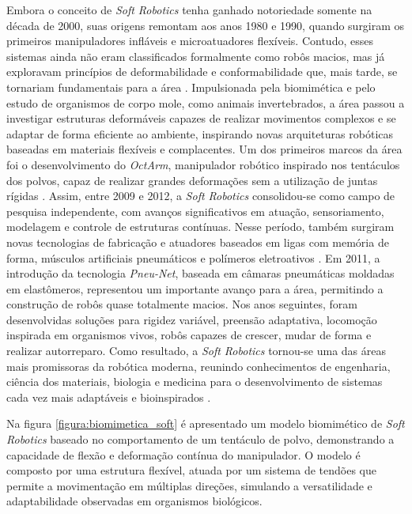 Embora o conceito de \textit{Soft Robotics} tenha ganhado notoriedade somente na década de 2000, suas origens remontam aos anos 1980 e 1990, 
quando surgiram os primeiros manipuladores infláveis e microatuadores flexíveis. Contudo, esses sistemas ainda não eram classificados formalmente 
como robôs macios, mas já exploravam princípios de deformabilidade e conformabilidade que, mais tarde, se tornariam fundamentais para a área \cite{Laschi2016SoftRobotics}. 
Impulsionada pela biomimética e pelo estudo de organismos de corpo mole, como animais invertebrados, a área passou a investigar estruturas deformáveis 
capazes de realizar movimentos complexos e se adaptar de forma eficiente ao ambiente, inspirando novas arquiteturas robóticas baseadas em materiais 
flexíveis e complacentes.
Um dos primeiros marcos da área foi o desenvolvimento do \textit{OctArm}, manipulador robótico inspirado nos tentáculos dos polvos, capaz de realizar 
grandes deformações sem a utilização de juntas rígidas \cite{Grissom2006OctArm}. Assim, entre 2009 e 2012, a \textit{Soft Robotics} consolidou-se como 
campo de pesquisa independente, com avanços significativos em atuação, sensoriamento, modelagem e controle de estruturas contínuas. Nesse período, 
também surgiram novas tecnologias de fabricação e atuadores baseados em ligas com memória de forma, músculos artificiais pneumáticos e polímeros 
eletroativos \cite{Laschi2016SoftRobotics}. Em 2011, a introdução da tecnologia \textit{Pneu-Net}, baseada em câmaras pneumáticas moldadas em elastômeros, 
representou um importante avanço para a área, permitindo a construção de robôs quase totalmente macios. Nos anos seguintes, foram desenvolvidas soluções 
para rigidez variável, preensão adaptativa, locomoção inspirada em organismos vivos, robôs capazes de crescer, mudar de forma e realizar autorreparo.
Como resultado, a \textit{Soft Robotics} tornou-se uma das áreas mais promissoras da robótica moderna, reunindo conhecimentos de engenharia, ciência dos 
materiais, biologia e medicina para o desenvolvimento de sistemas cada vez mais adaptáveis e bioinspirados \cite{Laschi2016SoftRobotics}.

Na figura \ref{figura:biomimetica_soft} é apresentado um modelo biomimético de \textit{Soft Robotics} baseado no comportamento de um tentáculo de polvo, 
demonstrando a capacidade de flexão e deformação contínua do manipulador. O modelo é composto por uma estrutura flexível, atuada por um sistema de tendões
que permite a movimentação em múltiplas direções, simulando a versatilidade e adaptabilidade observadas em organismos biológicos.

